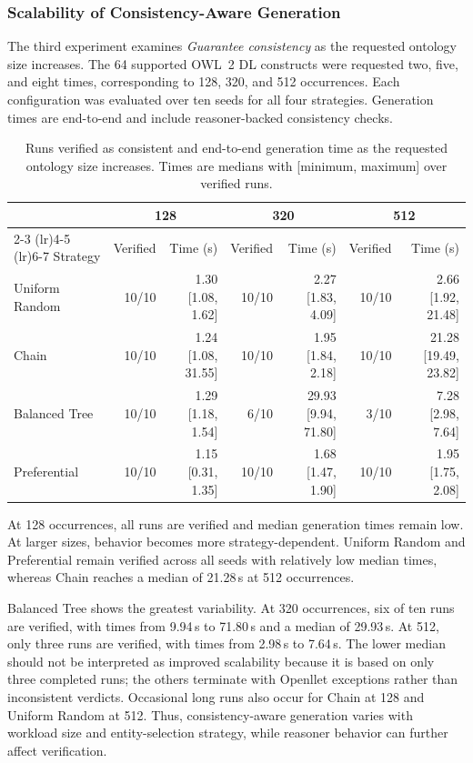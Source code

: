 \subsubsection{Scalability of Consistency-Aware Generation}

The third experiment examines \emph{Guarantee consistency} as the requested
ontology size increases. The 64 supported OWL~2 DL constructs were requested
two, five, and eight times, corresponding to 128, 320, and 512 occurrences.
Each configuration was evaluated over ten seeds for all four strategies.
Generation times are end-to-end and include reasoner-backed consistency
checks.

\begin{table}[htbp]
\centering
\caption{Runs verified as consistent and end-to-end generation time as the
requested ontology size increases. Times are medians with [minimum, maximum]
over verified runs.}
\label{tab:consistency-scaling}
\footnotesize
\setlength{\tabcolsep}{2.5pt}
\begin{tabular}{lrrrrrr}
\toprule
& \multicolumn{2}{c}{128} &
  \multicolumn{2}{c}{320} &
  \multicolumn{2}{c}{512} \\
\cmidrule(lr){2-3}
\cmidrule(lr){4-5}
\cmidrule(lr){6-7}
Strategy &
Verified & Time (s) &
Verified & Time (s) &
Verified & Time (s) \\
\midrule
Uniform Random
& 10/10 & 1.30 [1.08, 1.62]
& 10/10 & 2.27 [1.83, 4.09]
& 10/10 & 2.66 [1.92, 21.48] \\

Chain
& 10/10 & 1.24 [1.08, 31.55]
& 10/10 & 1.95 [1.84, 2.18]
& 10/10 & 21.28 [19.49, 23.82] \\

Balanced Tree
& 10/10 & 1.29 [1.18, 1.54]
& 6/10  & 29.93 [9.94, 71.80]
& 3/10  & 7.28 [2.98, 7.64] \\

Preferential
& 10/10 & 1.15 [0.31, 1.35]
& 10/10 & 1.68 [1.47, 1.90]
& 10/10 & 1.95 [1.75, 2.08] \\
\bottomrule
\end{tabular}
\end{table}

At 128 occurrences, all runs are verified and median generation times remain
low. At larger sizes, behavior becomes more strategy-dependent. Uniform
Random and Preferential remain verified across all seeds with relatively low
median times, whereas Chain reaches a median of 21.28\,s at 512 occurrences.

Balanced Tree shows the greatest variability. At 320 occurrences, six of ten
runs are verified, with times from 9.94\,s to 71.80\,s and a median of
29.93\,s. At 512, only three runs are verified, with times from 2.98\,s to
7.64\,s. The lower median should not be interpreted as improved scalability
because it is based on only three completed runs; the others terminate with
Openllet exceptions rather than inconsistent verdicts. Occasional long runs
also occur for Chain at 128 and Uniform Random at 512. Thus,
consistency-aware generation varies with workload size and entity-selection
strategy, while reasoner behavior can further affect verification.


